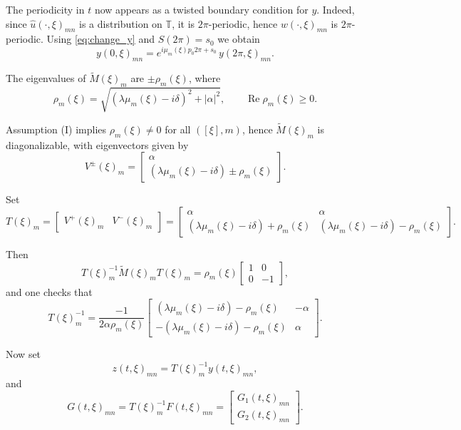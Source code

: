\documentclass[11pt,reqno]{amsart}
\numberwithin{equation}{section}
\begin{document}
The periodicity in $t$ now appears as a twisted boundary condition for $y$. Indeed, since $\widehat u(\cdot,\xi)_{mn}$ is a distribution on $\mathbb{T}$, it is $2\pi$-periodic, hence $w(\cdot,\xi)_{mn}$ is $2\pi$-periodic. Using \eqref{eq:change_y} and $S(2\pi)=s_0$ we obtain
\begin{equation}\label{eq:y_bc_detailed}
	y(0,\xi)_{mn}=e^{i\mu_m(\xi)p_0 2\pi+s_0}\,y(2\pi,\xi)_{mn}.
\end{equation}


The eigenvalues of $\widetilde M(\xi)_m$ are $\pm\rho_m(\xi)$, where
\[
\rho_m(\xi)=\sqrt{(\lambda\mu_m(\xi)-i\delta)^2+|\alpha|^2},\qquad \operatorname{Re}\rho_m(\xi)\ge 0.
\]

Assumption (I) implies $\rho_m(\xi)\neq 0$ for all $([\xi],m)$, hence $\widetilde M(\xi)_m$ is diagonalizable, with eigenvectors given by
\[V^\pm(\xi)_m =\begin{bmatrix}\alpha\\ (\lambda\mu_m(\xi)-i\delta)\pm\rho_m(\xi)\end{bmatrix}.\]

Set
\begin{equation*}
	T(\xi)_m =
	\begin{bmatrix}V^+(\xi)_m & V^-(\xi)_m\end{bmatrix}=
	\begin{bmatrix}
		\alpha & \alpha\\
		(\lambda\mu_m(\xi)-i\delta)+\rho_m(\xi) & (\lambda\mu_m(\xi)-i\delta)-\rho_m(\xi)
	\end{bmatrix}.
\end{equation*}

Then
\begin{equation}\label{eq:diag_relation}
	T(\xi)_m^{-1}\widetilde M(\xi)_mT(\xi)_m=\rho_m(\xi)
	\begin{bmatrix}
		1 & 0\\
		0 & -1
	\end{bmatrix},
\end{equation}
and one checks that
\[
T(\xi)_m^{-1}=\frac{-1}{2\alpha\rho_m(\xi)}
\begin{bmatrix}
	(\lambda\mu_m(\xi)-i\delta)-\rho_m(\xi) & -\alpha\\
	-(\lambda\mu_m(\xi)-i\delta)-\rho_m(\xi) & \alpha
\end{bmatrix}.
\]

Now set
\[
z(t,\xi)_{mn}=T(\xi)_m^{-1}y(t,\xi)_{mn},
\]
and 
\[
G(t,\xi)_{mn}=T(\xi)_m^{-1}F(t,\xi)_{mn}=
\begin{bmatrix}G_1(t,\xi)_{mn}\\ G_2(t,\xi)_{mn}\end{bmatrix}.
\]
\end{document}
